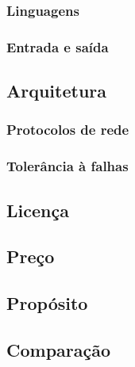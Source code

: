 \subsubsection{Linguagens}
\subsubsection{Entrada e saída}

\subsection{Arquitetura}

\subsubsection{Protocolos de rede}

\subsubsection{Tolerância à falhas}

\subsection{Licença}

\subsection{Preço}

\subsection{Propósito}

\subsection{Comparação}